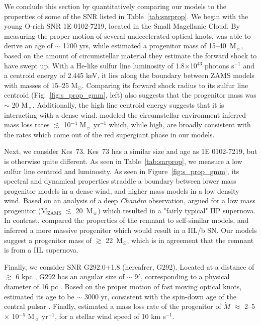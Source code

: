 \documentclass[twocolumn]{aastex631}
\begin{document}
We conclude this section by quantitatively comparing our models to the properties of some of the SNR listed in Table~\ref{tab:snrprop}. We begin with the young O-rich SNR 1E 0102-7219, located in the Small Magellanic Cloud. By measuring the proper motion of several undecelerated optical knots, \citet{banovetz21} was able to derive an age of $\sim$ 1700 yrs, while \citet{xi19} estimated a progenitor mass of 15--40~M$_{\sun}$, based on the amount of circumstellar material they estimate the forward shock to have swept up. With a He-like
sulfur line luminosity of 1.8$\times$10$^{43}$ photons s$^{-1}$ and a centroid energy of 2.445 keV, it lies along the boundary between ZAMS models with masses of 15--25 M$_{\odot}$. Comparing its forward shock radius to its sulfur line centroid (Fig.~\ref{fig:s_prop_gmm}, left) also suggests that the progenitor mass was $\sim$ 20 M$_{\sun}$. Additionally, the high line centroid energy suggests that it is interacting with a dense wind. \citet{xi19} modeled
the circumstellar environment inferred mass loss rates $\lesssim$ 10$^{-4}$ M$_{\sun}$ yr$^{-1}$ which, while high, are broadly consistent with the rates which come out of the red supergiant phase in our models.

Next, we consider Kes~73. Kes~73 has a similar size and age as 1E 0102-7219, but is otherwise quite different. As seen in Table~\ref{tab:snrprop}, we measure a low sulfur line centroid and luminosity. As seen in Figure~\ref{fig:s_prop_gmm}, its spectral and dynamical properties straddle a boundary between lower mass progenitor models in a dense wind, and higher mass models in a low density wind. Based on an analysis of a deep {\it Chandra} observation, \citet{borkowski17} argued for a low mass progenitor (M$_{\mathrm{ZAMS}}$ $\lesssim$ 20~M$_{\sun}$) which resulted in a "fairly typical" IIP supernova. In contrast, \citet{chevalier05} compared the properties of the remnant to self-similar models, and inferred a more massive progenitor which would result in a IIL/b SN. Our models suggest a progenitor mass of $\gtrsim$ 22~M$_{\odot}$, which is in agreement that the remnant is from a IIL supernova.

Finally, we consider SNR G292.0+1.8 (hereafrer, G292). Located at a distance of $\gtrsim$ 6 kpc \citep{gaensler03}, G292 has an angular size of $\sim$ 9$\mbox{$^\prime$}$, corresponding to a physical diameter of 16 pc \citep{park07}. Based on the 
proper motion of fast moving optical knots, \citet{ghavamian05} estimated its age to
be $\sim$ 3000 yr, consistent with the spin-down age of the central pulsar \citep[2900 yr;][]{camilo02}. Finally, \citet{jjlee10} estimated a mass loss rate of the progenitor of $\dot{M}$ $\approx$ 2--5 $\times$ 10$^{-5}$ M$_{\sun}$ yr$^{-1}$, for a stellar wind speed of 10 km s$^{-1}$. 
\end{document}

